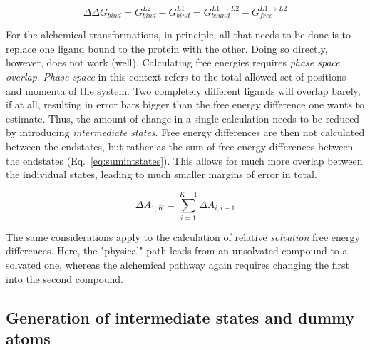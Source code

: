 \documentclass[oneside]{scrreprt}
\begin{document}
\begin{equation}
    \Delta \Delta G_{bind} = G^{L2}_{bind}-G^{L1}_{bind}=G^{L1\rightarrow L2}_{bound}-G^{L1\rightarrow L2}_{free}
    \label{eq:deltadeltaAbind}
\end{equation}


For the alchemical transformations, in principle, all that needs to be done is to replace one ligand bound to the protein with the other. Doing so directly, however, does not work (well). Calculating free energies requires \emph{phase space overlap}. \emph{Phase space} in this context refers to the total allowed set of positions and momenta of the system. Two completely different ligands will overlap barely, if at all, resulting in error bars bigger than the free energy difference one wants to estimate. Thus, the amount of change in a single calculation needs to be reduced by introducing \emph{intermediate states}. Free energy differences are then not calculated between the endstates, but rather as the sum of free energy differences between the endstates (Eq.~\ref{eq:sumintstates}). This allows for much more overlap between the individual states, leading to much smaller margins of error in total.

\begin{equation}
    \Delta A_{1,K} = \sum^{K-1}_{i=1} \Delta A_{i,i+1}
    \label{eq:sumintstates}
\end{equation}






The same considerations apply to the calculation of relative \emph{solvation} free energy differences. Here, the "physical" path leads from an unsolvated compound to a solvated one, whereas the alchemical pathway again requires changing the first into the second compound.

\subsection{Generation of intermediate states and dummy atoms} \label{sec:intstatesanddummys}
\end{document}
